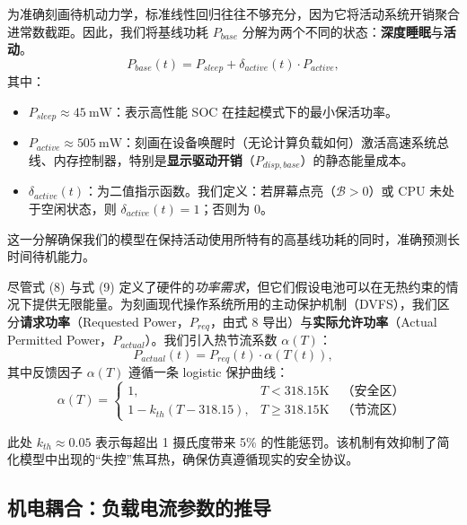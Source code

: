 \documentclass[11pt,a4paper]{ctexart}
\begin{document}
为准确刻画待机动力学，标准线性回归往往不够充分，因为它将活动系统开销聚合进常数截距。因此，我们将基线功耗 $P_{base}$ 分解为两个不同的状态：\textbf{深度睡眠}与\textbf{活动}。
\begin{equation}
P_{base}(t) = P_{sleep} + \delta_{active}(t)\cdot P_{active},
\end{equation}
其中：

\begin{itemize}[leftmargin=1.6em,itemsep=0.2em]
\item $P_{sleep}\approx 45\ \mathrm{mW}$：表示高性能 SOC 在挂起模式下的最小保活功率。
\item $P_{active}\approx 505\ \mathrm{mW}$：刻画在设备唤醒时（无论计算负载如何）激活高速系统总线、内存控制器，特别是\textbf{显示驱动开销}（$P_{disp,base}$）的静态能量成本。
\item $\delta_{active}(t)$：为二值指示函数。我们定义：若屏幕点亮（$\mathcal{B}>0$）或 CPU 未处于空闲状态，则 $\delta_{active}(t)=1$；否则为 0。
\end{itemize}

这一分解确保我们的模型在保持活动使用所特有的高基线功耗的同时，准确预测长时间待机能力。

尽管式 (8) 与式 (9) 定义了硬件的\emph{功率需求}，但它们假设电池可以在无热约束的情况下提供无限能量。为刻画现代操作系统所用的主动保护机制（DVFS），我们区分\textbf{请求功率}（Requested Power，$P_{req}$，由式 8 导出）与\textbf{实际允许功率}（Actual Permitted Power，$P_{actual}$）。我们引入热节流系数 $\alpha(T)$：
\begin{equation}
P_{actual}(t) = P_{req}(t)\cdot\alpha(T(t)),
\end{equation}
其中反馈因子 $\alpha(T)$ 遵循一条 logistic 保护曲线：
\begin{equation}
\alpha(T)=
\begin{cases}
1, & T<318.15\mathrm{K}\quad\text{（安全区）}\\[3pt]
1-k_{th}(T-318.15), & T\geq 318.15\mathrm{K}\quad\text{（节流区）}
\end{cases}
\end{equation}

此处 $k_{th}\approx 0.05$ 表示每超出 1 摄氏度带来 5\% 的性能惩罚。该机制有效抑制了简化模型中出现的“失控”焦耳热，确保仿真遵循现实的安全协议。

\subsection{机电耦合：负载电流参数的推导}
\end{document}
